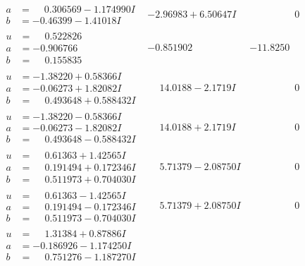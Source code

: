 \documentclass[1p]{elsarticle_modified}
\theoremstyle{definition}
\begin{document}
$$\begin{array}{c|c|c}
\begin{aligned}
a &= \phantom{-}0.306569 - 1.174990 I \\
b &= -0.46399 - 1.41018 I\end{aligned}
 & -2.96983 + 6.50647 I & \phantom{-0.000000 } 0 \\ \hline\begin{aligned}
u &= \phantom{-}0.522826\phantom{ +0.000000I} \\
a &= -0.906766\phantom{ +0.000000I} \\
b &= \phantom{-}0.155835\phantom{ +0.000000I}\end{aligned}
 & -0.851902\phantom{ +0.000000I} & -11.8250\phantom{ +0.000000I} \\ \hline\begin{aligned}
u &= -1.38220 + 0.58366 I \\
a &= -0.06273 + 1.82082 I \\
b &= \phantom{-}0.493648 + 0.588432 I\end{aligned}
 & \phantom{-}14.0188 - 2.1719 I & \phantom{-0.000000 } 0 \\ \hline\begin{aligned}
u &= -1.38220 - 0.58366 I \\
a &= -0.06273 - 1.82082 I \\
b &= \phantom{-}0.493648 - 0.588432 I\end{aligned}
 & \phantom{-}14.0188 + 2.1719 I & \phantom{-0.000000 } 0 \\ \hline\begin{aligned}
u &= \phantom{-}0.61363 + 1.42565 I \\
a &= \phantom{-}0.191494 + 0.172346 I \\
b &= \phantom{-}0.511973 + 0.704030 I\end{aligned}
 & \phantom{-}5.71379 - 2.08750 I & \phantom{-0.000000 } 0 \\ \hline\begin{aligned}
u &= \phantom{-}0.61363 - 1.42565 I \\
a &= \phantom{-}0.191494 - 0.172346 I \\
b &= \phantom{-}0.511973 - 0.704030 I\end{aligned}
 & \phantom{-}5.71379 + 2.08750 I & \phantom{-0.000000 } 0 \\ \hline\begin{aligned}
u &= \phantom{-}1.31384 + 0.87886 I \\
a &= -0.186926 - 1.174250 I \\
b &= \phantom{-}0.751276 - 1.187270 I\end{aligned}

\end{array}$$
\end{document}
